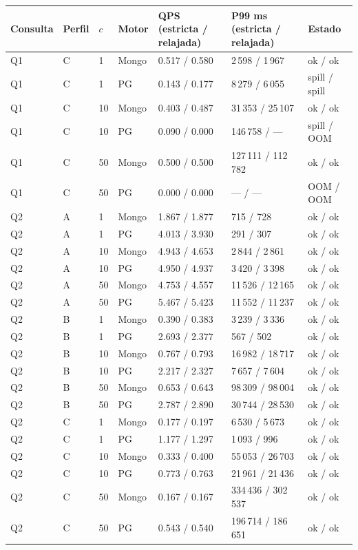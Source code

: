\begin{tabular}{@{}lllllll@{}}
\toprule
Consulta & Perfil & $c$ & Motor & QPS (estricta / relajada) & P99 ms (estricta / relajada) & Estado \\
\midrule
Q1 & C & 1 & Mongo & 0.517 / 0.580 & 2\,598 / 1\,967 & ok / ok \\
Q1 & C & 1 & PG & 0.143 / 0.177 & 8\,279 / 6\,055 & spill / spill \\
Q1 & C & 10 & Mongo & 0.403 / 0.487 & 31\,353 / 25\,107 & ok / ok \\
Q1 & C & 10 & PG & 0.090 / 0.000 & 146\,758 / --- & spill / OOM \\
Q1 & C & 50 & Mongo & 0.500 / 0.500 & 127\,111 / 112\,782 & ok / ok \\
Q1 & C & 50 & PG & 0.000 / 0.000 & --- / --- & OOM / OOM \\
\addlinespace[2pt]
Q2 & A & 1 & Mongo & 1.867 / 1.877 & 715 / 728 & ok / ok \\
Q2 & A & 1 & PG & 4.013 / 3.930 & 291 / 307 & ok / ok \\
Q2 & A & 10 & Mongo & 4.943 / 4.653 & 2\,844 / 2\,861 & ok / ok \\
Q2 & A & 10 & PG & 4.950 / 4.937 & 3\,420 / 3\,398 & ok / ok \\
Q2 & A & 50 & Mongo & 4.753 / 4.557 & 11\,526 / 12\,165 & ok / ok \\
Q2 & A & 50 & PG & 5.467 / 5.423 & 11\,552 / 11\,237 & ok / ok \\
Q2 & B & 1 & Mongo & 0.390 / 0.383 & 3\,239 / 3\,336 & ok / ok \\
Q2 & B & 1 & PG & 2.693 / 2.377 & 567 / 502 & ok / ok \\
Q2 & B & 10 & Mongo & 0.767 / 0.793 & 16\,982 / 18\,717 & ok / ok \\
Q2 & B & 10 & PG & 2.217 / 2.327 & 7\,657 / 7\,604 & ok / ok \\
Q2 & B & 50 & Mongo & 0.653 / 0.643 & 98\,309 / 98\,004 & ok / ok \\
Q2 & B & 50 & PG & 2.787 / 2.890 & 30\,744 / 28\,530 & ok / ok \\
Q2 & C & 1 & Mongo & 0.177 / 0.197 & 6\,530 / 5\,673 & ok / ok \\
Q2 & C & 1 & PG & 1.177 / 1.297 & 1\,093 / 996 & ok / ok \\
Q2 & C & 10 & Mongo & 0.333 / 0.400 & 55\,053 / 26\,703 & ok / ok \\
Q2 & C & 10 & PG & 0.773 / 0.763 & 21\,961 / 21\,436 & ok / ok \\
Q2 & C & 50 & Mongo & 0.167 / 0.167 & 334\,436 / 302\,537 & ok / ok \\
Q2 & C & 50 & PG & 0.543 / 0.540 & 196\,714 / 186\,651 & ok / ok \\
\bottomrule
\end{tabular}
